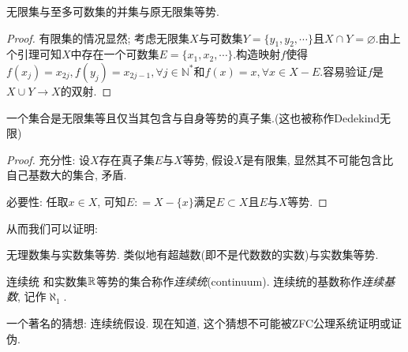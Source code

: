 \begin{theorem}{}
	无限集与至多可数集的并集与原无限集等势.
\end{theorem}
\begin{proof}
	有限集的情况显然; 考虑无限集$X$与可数集$Y=\{ y_1, y_2, \cdots \}$且$X \cap Y = \varnothing$.由上个引理可知$X$中存在一个可数集$E=\{ x_1, x_2, \cdots \}$.构造映射$f$使得$f(x_j)=x_{2j}, f(y_j)=x_{2j-1},  \forall j \in \mathbb{N}^*$和$f(x)=x, \forall x \in X-E$.容易验证$f$是$X \cup Y \to X$的双射.
\end{proof}

\begin{theorem}{}
	一个集合是无限集等且仅当其包含与自身等势的真子集.(这也被称作Dedekind无限)
\end{theorem}
\begin{proof}
	充分性: 设$X$存在真子集$E$与$X$等势, 假设$X$是有限集, 显然其不可能包含比自己基数大的集合, 矛盾.
	
	必要性: 任取$x \in X$, 可知$E: =X-\{x\}$满足$E \subset X$且$E$与$X$等势.
\end{proof}

从而我们可以证明: 

\begin{proposition}{}
	无理数集与实数集等势. 类似地有超越数(即不是代数数的实数)与实数集等势.
\end{proposition}

\begin{definition}{连续统}
	和实数集$\mathbb{R}$等势的集合称作\textit{连续统}(continuum). 连续统的基数称作\textit{连续基数}, 记作$\aleph _1$.
\end{definition}

一个著名的猜想: 连续统假设. 现在知道, 这个猜想不可能被ZFC公理系统证明或证伪.





